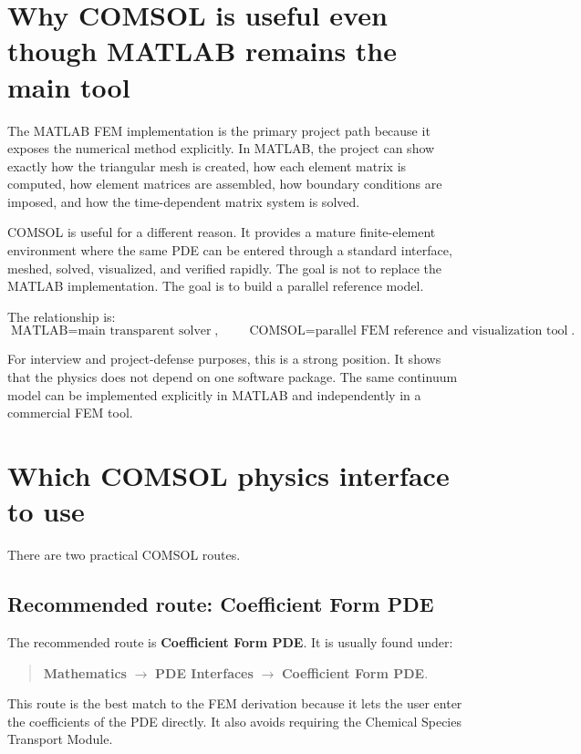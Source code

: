 \documentclass[11pt]{article}
\begin{document}
\section{Why COMSOL is useful even though MATLAB remains the main tool}

The MATLAB FEM implementation is the primary project path because it exposes the numerical method explicitly. In MATLAB, the project can show exactly how the triangular mesh is created, how each element matrix is computed, how element matrices are assembled, how boundary conditions are imposed, and how the time-dependent matrix system is solved.

COMSOL is useful for a different reason. It provides a mature finite-element environment where the same PDE can be entered through a standard interface, meshed, solved, visualized, and verified rapidly. The goal is not to replace the MATLAB implementation. The goal is to build a parallel reference model.

The relationship is:
\begin{equation}
\boxed{\text{MATLAB} = \text{main transparent solver}},
\qquad
\boxed{\text{COMSOL} = \text{parallel FEM reference and visualization tool}}.
\end{equation}

For interview and project-defense purposes, this is a strong position. It shows that the physics does not depend on one software package. The same continuum model can be implemented explicitly in MATLAB and independently in a commercial FEM tool.

\section{Which COMSOL physics interface to use}

There are two practical COMSOL routes.

\subsection{Recommended route: Coefficient Form PDE}

The recommended route is \textbf{Coefficient Form PDE}. It is usually found under:
\begin{quote}
\textbf{Mathematics} $\rightarrow$ \textbf{PDE Interfaces} $\rightarrow$ \textbf{Coefficient Form PDE}.
\end{quote}

This route is the best match to the FEM derivation because it lets the user enter the coefficients of the PDE directly. It also avoids requiring the Chemical Species Transport Module.
\end{document}
